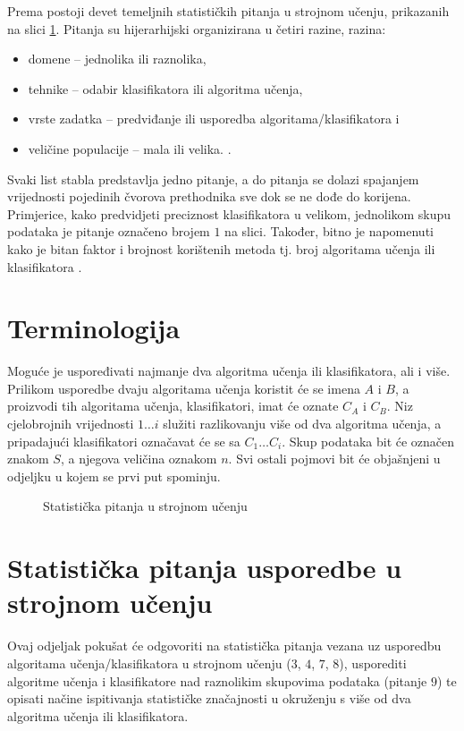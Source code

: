 Prema \citep{dietterich1998approximate} postoji devet temeljnih statističkih pitanja u strojnom učenju, prikazanih na slici \ref{fig:stat_questions}. Pitanja su hijerarhijski organizirana u četiri razine, razina: 
\begin{itemize}
\item domene -- jednolika ili raznolika,
\item tehnike -- odabir klasifikatora ili algoritma učenja,
\item vrste zadatka -- predviđanje ili usporedba algoritama/klasifikatora i 
\item veličine populacije -- mala ili velika.
 . 
\end{itemize}
Svaki list stabla predstavlja jedno pitanje, a do pitanja se dolazi spajanjem vrijednosti pojedinih čvorova prethodnika sve dok se ne dođe do korijena. Primjerice, kako predvidjeti preciznost klasifikatora u velikom, jednolikom skupu podataka je pitanje označeno brojem $1$ na slici. Također, bitno je napomenuti kako je bitan faktor i brojnost korištenih metoda tj. broj algoritama učenja ili klasifikatora \citep{demvsar2006statistical}.


\section{Terminologija}

Moguće je uspoređivati najmanje dva algoritma učenja ili klasifikatora, ali i više. Prilikom usporedbe dvaju algoritama učenja koristit će se imena $A$ i $B$, a proizvodi tih algoritama učenja, klasifikatori, imat će oznate $C_A$ i $C_B$. Niz cjelobrojnih vrijednosti $1\dots i$ služiti razlikovanju više od dva algoritma učenja, a pripadajući klasifikatori označavat će se sa $C_1 \dots C_i$. Skup podataka bit će označen znakom $S$, a njegova veličina oznakom $n$. Svi ostali pojmovi bit će objašnjeni u odjeljku u kojem se prvi put spominju.

\begin{figure}[h]
\centering

\caption{Statistička pitanja u strojnom učenju}
\label{fig:stat_questions}
\end{figure}

\section{Statistička pitanja usporedbe u strojnom učenju}

Ovaj odjeljak pokušat će odgovoriti na statistička pitanja vezana uz usporedbu algoritama učenja/klasifikatora u strojnom učenju ($3$, $4$, $7$, $8$), usporediti algoritme učenja i klasifikatore nad raznolikim skupovima podataka (pitanje $9$) te opisati načine ispitivanja statističke značajnosti u okruženju s više od dva algoritma učenja ili klasifikatora.

